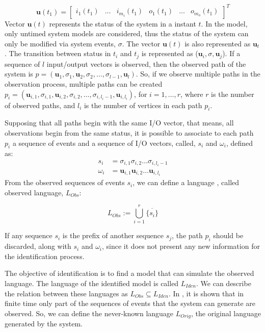 \begin{equation*}
\mathbf{u}(t_1)=
\begin{bmatrix}
  i_1(t_1)&
  \dots&
  i_{m_i}(t_1)&
  o_1(t_1)&
  \dots&
  o_{m_o}(t_1)
\end{bmatrix}^T
\end{equation*}
\newcommand{\vu}{\mathbf{u}}
 Vector $\mathbf{u}(t)$ represents the status of the system in a instant
 $t$. In the \DAOCT{} model, only untimed system models are considered, thus
 the status of the system can only be modified via system events, $\sigma$.
The vector $\mathbf{u}(t)$ is also represented as $\vu_t$.
 The
 transition between status in $t_i$ and $t_j$ is represented as
 ($\vu_i,\sigma,\vu_j$).
 If a sequence of
 $l$ input\slash output vectors is observed, then the observed path of the
 system is
 $p=(\vu_1,\sigma_1,\vu_2,\sigma_2,\dots,\sigma_{l-1},\vu_l)$.
So, if we observe multiple paths in the observation process, 
multiple paths can be created
$p_i=(\vu_{i,1},\sigma_{i,1},\vu_{i,2},\sigma_{i,2},\dots,\sigma_{i,l_i-1},\vu_{i,l_i})$,
for $i=1,\dots,r$, where $r$ is the number of observed paths, and $l_i$ is the
number of vertices in each path $p_i$.

Supposing that all paths begin with the same I\slash O vector, that means, all
observations begin from the same status, it is possible to associate to each
path $p_i$ a sequence of events and a sequence of I\slash O vectors, called,
$s_i$ and $\omega_i$, defined as:
\begin{align*}
  s_i&= \sigma_{i,1}\sigma_{i,2}\dots\sigma_{i,l_i-1} \\
  \omega_i&= \vu_{i,1}\vu_{i,2}\dots\vu_{i,l_i}
\end{align*}
From the observed sequences of events $s_i$, we can define a language
, called observed language, $L_{Obs}$:

\begin{equation}
  L_{Obs}:= \bigcup^r_{i=1}\overline{\{s_i\}}
\end{equation}
\begin{observation}
If any sequence $s_i$ is the prefix of another sequence $s_j$, the path $p_i$ should
be discarded, along with $s_i$ and $\omega_i$, since it does not present any new
information for the identification process.
\end{observation}
The objective of identification is to find a model that
can simulate the observed language. The language of the identified model is
called $L_{Iden}$.
We can describe the relation between these languages as $L_{Obs} \subseteq
L_{Iden}$.
In
\cite{moreira2018enhanced}, it is shown that in finite time only part of the
sequences  of events that
the system can generate are observed. So, we can define the never-known language $L_{Orig}$,
the original language generated by the system.

